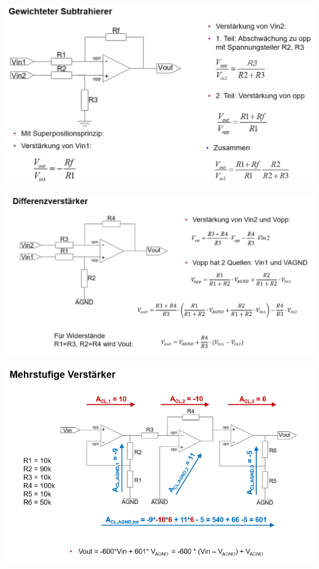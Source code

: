 \includegraphics[width=\linewidth]{Images/opamp_invertierend_subtrahierer}

\includegraphics[width=\linewidth]{Images/opamp_differenz}
 
\includegraphics[width=\linewidth]{Images/opamp_mehrstufig}


